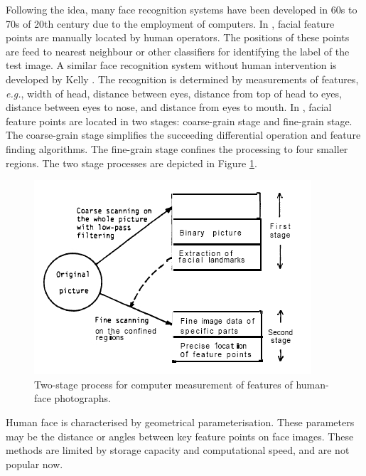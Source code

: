 Following the idea, many face recognition systems have been developed in 60s to 70s of 20th century due to the employment of computers. In \cite{Bledsoe1964}, facial feature points are manually located by human operators. The positions of these points are feed to nearest neighbour or other classifiers for identifying the label of the test image. A similar face recognition system without human intervention is developed by Kelly \cite{Kelly1970}. The recognition is determined by measurements of features, \textit{e.g.}, width of head, distance between eyes, distance from top of head to eyes, distance between eyes to nose, and distance from eyes to mouth. In \cite{Kanade1977}, facial feature points are located in two stages: coarse-grain stage and fine-grain stage. The coarse-grain stage simplifies the succeeding differential operation and feature finding algorithms. The fine-grain stage confines the processing to four smaller regions. The two stage processes are depicted in \mbox{Figure} \ref{fig:Kanade1977}. 
\begin{figure}[ht]
  \begin{center}
  \includegraphics[width=0.8\columnwidth]{ch2/figures/kanade1977.jpg}
   \caption{Two-stage process for computer measurement of features of human-face photographs. \cite{Kanade1977}}
 \label{fig:Kanade1977}
  \end{center}
\end{figure}
 
Human face is characterised by geometrical parameterisation. These parameters may be the distance or angles between key feature points on face images. These methods are limited by storage capacity and computational speed, and are not popular now.

